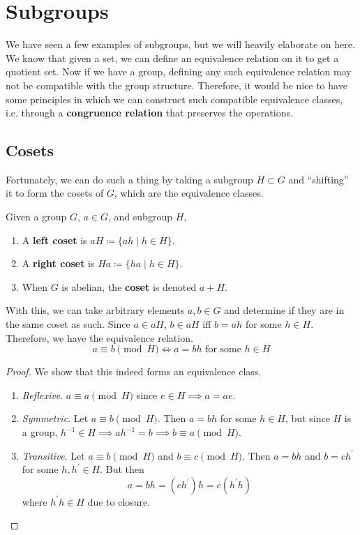 \section{Subgroups} 

  We have seen a few examples of subgroups, but we will heavily elaborate on here. We know that given a set, we can define an equivalence relation on it to get a quotient set. Now if we have a group, defining any such equivalence relation may not be compatible with the group structure. Therefore, it would be nice to have some principles in which we can construct such compatible equivalence classes, i.e. through a \textbf{congruence relation} that preserves the operations. 

\subsection{Cosets}

  Fortunately, we can do such a thing by taking a subgroup $H \subset G$ and ``shifting'' it to form the cosets of $G$, which are the equivalence classes. 
  
  \begin{definition}[Coset]
    Given a group $G$, $a \in G$, and subgroup $H$, 
    \begin{enumerate}
      \item A \textbf{left coset} is $a H \coloneqq \{a h \mid h \in H \}$. 
      \item A \textbf{right coset} is $H a \coloneqq \{h a \mid h \in H \}$. 
      \item When $G$ is abelian, the \textbf{coset} is denoted $a + H$. 
    \end{enumerate}
    With this, we can take arbitrary elements $a, b \in G$ and determine if they are in the same coset as such. Since $a \in aH$, $b \in aH$ iff $b = ah$ for some $h \in H$. Therefore, we have the equivalence relation. 
    \begin{equation}
      a \equiv b \pmod{H} \iff a = b h \text{ for some } h \in H
    \end{equation}
  \end{definition}
  \begin{proof}
    We show that this indeed forms an equivalence class. 
    \begin{enumerate}
      \item \textit{Reflexive}. $a \equiv a \pmod{H}$ since $e \in H \implies a = a e$. 
      \item \textit{Symmetric}. Let $a \equiv b \pmod{H}$. Then $a = bh$ for some $h \in H$, but since $H$ is a group, $h^{-1} \in H \implies a h^{-1} = b \implies b \equiv a \pmod{H}$. 
      \item \textit{Transitive}. Let $a \equiv b \pmod{H}$ and $b \equiv c \pmod{H}$. Then $a = bh$ and $b = ch^\prime$ for some $h, h^\prime \in H$. But then 
      \begin{equation}
        a = bh = (ch^\prime) h = c(h^\prime h)
      \end{equation}
      where $h^\prime h \in H$ due to closure. 
    \end{enumerate}
  \end{proof} 

